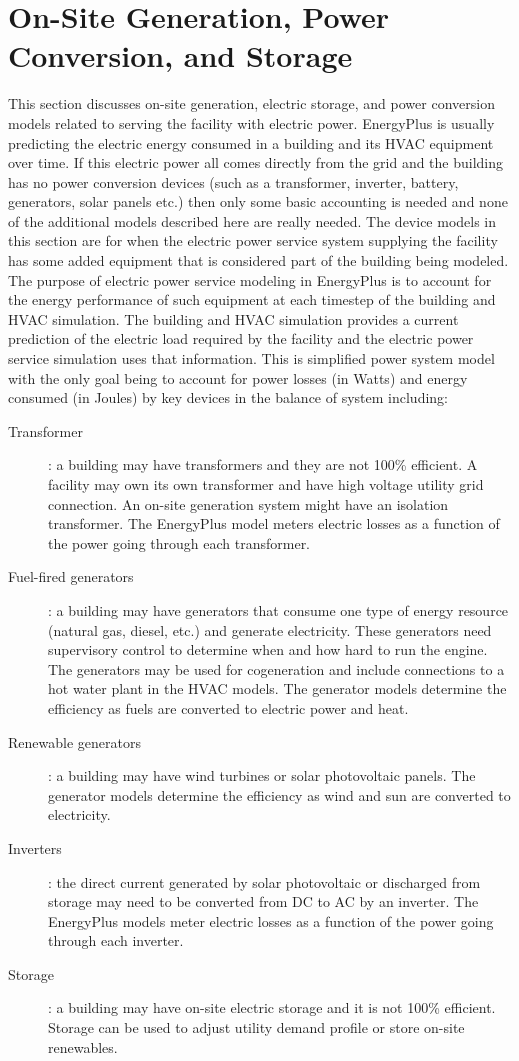 \chapter{On-Site Generation, Power Conversion, and Storage}\label{on-site-generation}

This section discusses on-site generation, electric storage, and power conversion models related to serving the facility with electric power.  EnergyPlus is usually predicting the electric energy consumed in a building and its HVAC equipment over time.  If this electric power all comes directly from the grid and the building has no power conversion devices (such as a transformer, inverter, battery, generators, solar panels etc.) then only some basic accounting is needed and none of the additional models described here are really needed.  The device models in this section are for when the electric power service system supplying the facility has some added equipment that is considered part of the building being modeled.   The purpose of electric power service modeling in EnergyPlus is to account for the energy performance of such equipment at each timestep of the building and HVAC simulation.  The building and HVAC simulation provides a current prediction of the electric load required by the facility and the electric power service simulation uses that information.   This is simplified power system model with the only goal being to account for power losses (in Watts) and energy consumed (in Joules) by key devices in the balance of system including:

\begin{description}
  \item[Transformer]: a building may have transformers and they are not 100\% efficient. A facility may own its own transformer and have high voltage utility grid connection. An on-site generation system might have an isolation transformer.  The EnergyPlus model meters electric losses as a function of the power going through each transformer.
  \item[Fuel-fired generators]: a building may have generators that consume one type of energy resource (natural gas, diesel, etc.) and generate electricity.  These generators need supervisory control to determine when and how hard to run the engine.  The generators may be used for cogeneration and include connections to a hot water plant in the HVAC models.  The generator models determine the efficiency as fuels are converted to electric power and heat. 
  \item[Renewable generators]: a building may have wind turbines or solar photovoltaic panels.  The generator models determine the efficiency as wind and sun are converted to electricity.
  \item[Inverters]: the direct current generated by solar photovoltaic or discharged from storage may need to be converted from DC to AC by an inverter.  The EnergyPlus models meter electric losses as a function of the power going through each inverter.
  \item[Storage]: a building may have on-site electric storage and it is not 100\% efficient.  Storage can be used to adjust utility demand profile or store on-site renewables.
\end{description}

